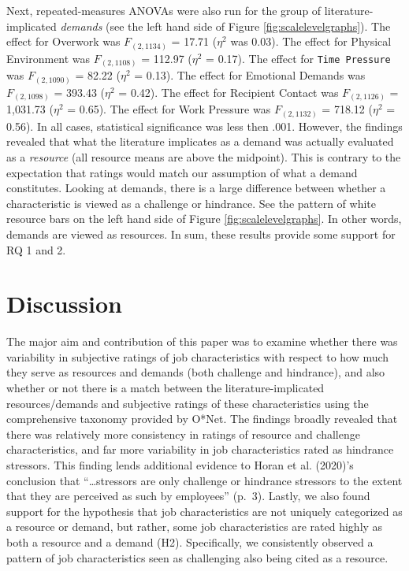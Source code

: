 \documentclass[
  jou,mask]{apa6}
\begin{document}
Next, repeated-measures ANOVAs were also run for the group of literature-implicated \emph{demands} (see the left hand side of Figure \ref{fig:scalelevelgraphs}). The effect for Overwork was \(F_{(2, 1134)}\) = 17.71 (\(\eta^2\) was 0.03). The effect for Physical Environment was \(F_{(2, 1108)}\) = 112.97 (\(\eta^2\) = 0.17). The effect for \texttt{Time\ Pressure} was \(F_{(2, 1090)}\) = 82.22 (\(\eta^2\) = 0.13). The effect for Emotional Demands was \(F_{(2, 1098)}\) = 393.43 (\(\eta^2\) = 0.42).
The effect for Recipient Contact was \(F_{(2, 1126)}\) = 1,031.73 (\(\eta^2\) = 0.65). The effect for Work Pressure was \(F_{(2, 1132)}\) = 718.12 (\(\eta^2\) = 0.56). In all cases, statistical significance was less then .001. However, the findings revealed that what the literature implicates as a demand was actually evaluated as a \emph{resource} (all resource means are above the midpoint). This is contrary to the expectation that ratings would match our assumption of what a demand constitutes. Looking at demands, there is a large difference between whether a characteristic is viewed as a challenge or hindrance. See the pattern of white resource bars on the left hand side of Figure \ref{fig:scalelevelgraphs}. In other words, demands are viewed as resources. In sum, these results provide some support for RQ 1 and 2.

\hypertarget{discussion}{%
\section{Discussion}\label{discussion}}

The major aim and contribution of this paper was to examine whether there was variability in subjective ratings of job characteristics with respect to how much they serve as resources and demands (both challenge and hindrance), and also whether or not there is a match between the literature-implicated resources/demands and subjective ratings of these characteristics using the comprehensive taxonomy provided by O*Net. The findings broadly revealed that there was relatively more consistency in ratings of resource and challenge characteristics, and far more variability in job characteristics rated as hindrance stressors. This finding lends additional evidence to Horan et al. (2020)'s conclusion that ``\ldots stressors are only challenge or hindrance stressors to the extent that they are perceived as such by employees'' (p.~3). Lastly, we also found support for the hypothesis that job characteristics are not uniquely categorized as a resource or demand, but rather, some job characteristics are rated highly as both a resource and a demand (H2). Specifically, we consistently observed a pattern of job characteristics seen as challenging also being cited as a resource.
\end{document}
